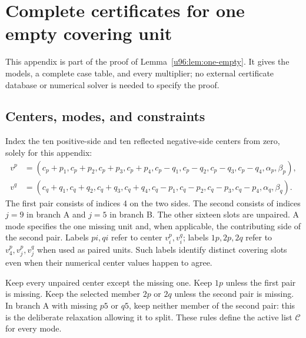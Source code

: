 \documentclass[11pt,a4paper]{article}
\theoremstyle{remark}
\begin{document}
\section{Complete certificates for one empty covering unit}\label{u96:app:one-empty}
This appendix is part of the proof of Lemma~\ref{u96:lem:one-empty}. It gives
the models, a complete case table, and every multiplier; no external
certificate database or numerical solver is needed to specify the proof.

\subsection{Centers, modes, and constraints}
Index the ten positive-side and ten reflected negative-side centers from
zero, solely for this appendix:
\[
\begin{aligned}
v^p&=(c_p+p_1,c_p+p_2,c_p+p_3,c_p+p_4,
       c_p-q_1,c_p-q_2,c_p-q_3,c_p-q_4,\alpha_p,\beta_p),\\
v^q&=(c_q+q_1,c_q+q_2,c_q+q_3,c_q+q_4,
       c_q-p_1,c_q-p_2,c_q-p_3,c_q-p_4,\alpha_q,\beta_q).
\end{aligned}
\]
The first pair consists of indices 4 on the two sides. The second consists
of indices $j=9$ in branch A and $j=5$ in branch B. The other sixteen slots
are unpaired. A mode specifies the one missing unit and, when applicable,
the contributing side of the second pair. Labels $pi,qi$ refer to center
$v_i^p,v_i^q$; labels $1p,2p,2q$ refer to $v_4^p,v_j^p,v_j^q$ when used
as paired units. Such labels identify distinct covering slots even when
their numerical center values happen to agree.

Keep every unpaired center except the missing one. Keep $1p$ unless the
first pair is missing. Keep the selected member $2p$ or $2q$ unless the
second pair is missing. In branch A with missing $p5$ or $q5$, keep neither
member of the second pair: this is the deliberate relaxation allowing it
to split. These rules define the active list $\mathcal C$ for every mode.
\end{document}
